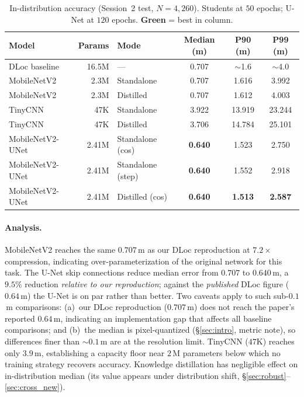 \documentclass[11pt,a4paper]{article}
\newcommand{\best}[1]{\textcolor{ours}{\textbf{#1}}}
\begin{document}
\begin{table}[H]
\centering
\caption{In-distribution accuracy (Session~2 test, $N=4{,}260$). Students at $50$ epochs;
U-Net at $120$ epochs. \best{Green} = best in column.}
\label{tab:indist}
\begin{tabular}{@{}lrlccc@{}}
\toprule
\textbf{Model} & \textbf{Params} & \textbf{Mode} & \textbf{Median (m)} & \textbf{P90 (m)} & \textbf{P99 (m)} \\
\midrule
DLoc baseline & 16.5M & ---        & 0.707 & $\sim$1.6 & $\sim$4.0 \\
\midrule
MobileNetV2   & 2.3M  & Standalone & 0.707 & 1.616 & 3.992 \\
MobileNetV2   & 2.3M  & Distilled  & 0.707 & 1.612 & 4.003 \\
TinyCNN       & 47K   & Standalone & 3.922 & 13.919 & 23.244 \\
TinyCNN       & 47K   & Distilled  & 3.706 & 14.784 & 25.101 \\
MobileNetV2-UNet & 2.41M & Standalone (cos) & \best{0.640} & 1.523 & 2.750 \\
MobileNetV2-UNet & 2.41M & Standalone (step)& \best{0.640} & 1.552 & 2.918 \\
MobileNetV2-UNet & 2.41M & Distilled (cos)  & \best{0.640} & \best{1.513} & \best{2.587} \\
\bottomrule
\end{tabular}
\end{table}

\paragraph{Analysis.} MobileNetV2 reaches the same $0.707$\,m as our DLoc reproduction at
$7.2\times$ compression, indicating over-parameterization of the original network for this task.
The U-Net skip connections reduce median error from $0.707$ to $0.640$\,m, a $9.5\%$ reduction
\emph{relative to our reproduction}; against the \emph{published} DLoc figure ($0.64$\,m) the
U-Net is on par rather than better. Two caveats apply to such sub-$0.1$\,m comparisons:
(a)~our DLoc reproduction ($0.707$\,m) does not reach the paper's reported $0.64$\,m, indicating
an implementation gap that affects all baseline comparisons; and (b)~the median is pixel-quantized
(\S\ref{sec:intro}, metric note), so differences finer than ${\sim}0.1$\,m are at the
resolution limit. TinyCNN ($47$K) reaches only $3.9$\,m, establishing a capacity floor near
$2$\,M parameters below which no training strategy recovers accuracy.
Knowledge distillation has negligible effect on in-distribution median (its value appears under
distribution shift, \S\ref{sec:robust}--\ref{sec:cross_new}).
\end{document}
